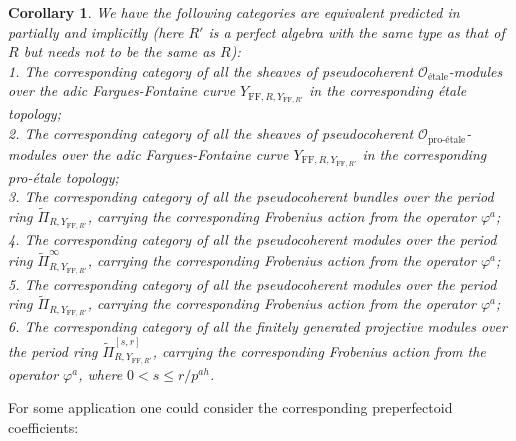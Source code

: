 \documentclass[12pt]{amsart}
\newtheorem{corollary}[theorem]{Corollary}
\theoremstyle{definition}
\numberwithin{equation}{section}
\begin{document}
\begin{corollary} \label{corollary3.12}
We have the following categories are equivalent predicted in \cite{CKZ} partially and implicitly (here $R'$ is a perfect algebra with the same type as that of $R$ but needs not to be the same as $R$):	\\
1. The corresponding category of all the sheaves of pseudocoherent $\mathcal{O}_{\text{\'etale}}$-modules over the adic Fargues-Fontaine curve $Y_{\mathrm{FF},R,Y_{\mathrm{FF},R'}}$ in the corresponding \'etale topology;\\
2. The corresponding category of all the sheaves of pseudocoherent $\mathcal{O}_{\text{pro-\'etale}}$-modules over the adic Fargues-Fontaine curve $Y_{\mathrm{FF},R,Y_{\mathrm{FF},R'}}$ in the corresponding pro-\'etale topology;\\
3. The corresponding category of all the pseudocoherent bundles over the period ring $\widetilde{\Pi}_{R,Y_{\mathrm{FF},R'}}$, carrying the corresponding Frobenius action from the operator $\varphi^a$;\\
4. The corresponding category of all the pseudocoherent modules over the period ring $\widetilde{\Pi}^{\infty}_{R,Y_{\mathrm{FF},R'}}$, carrying the corresponding Frobenius action from the operator $\varphi^a$;\\
5. The corresponding category of all the pseudocoherent modules over the period ring $\widetilde{\Pi}^{}_{R,Y_{\mathrm{FF},R'}}$, carrying the corresponding Frobenius action from the operator $\varphi^a$;\\
6. The corresponding category of all the finitely generated projective modules over the period ring $\widetilde{\Pi}^{[s,r]}_{R,Y_{\mathrm{FF},R'}}$, carrying the corresponding Frobenius action from the operator $\varphi^a$, where $0<s\leq r/p^{ah}$.
\end{corollary}

\indent For some application one could consider the corresponding preperfectoid coefficients:
\end{document}

